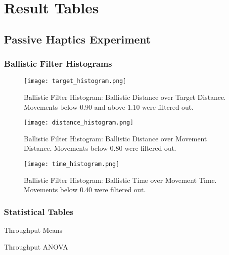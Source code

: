\chapter{Result Tables}

\section{Passive Haptics Experiment}
\label{sec:app_ph_exp}

\subsection{Ballistic Filter Histograms}
\label{sec:app_ph_metrics}

\begin{figure}[H]
    \centering
    \texttt{[image: target\_histogram.png]}
    \caption{Ballistic Filter Histogram: Ballistic Distance over Target Distance. Movements below 0.90 and above 1.10 were filtered out.}
    \label{fig:ph_histogram_target}
\end{figure}

\begin{figure}[H]
    \centering
    \texttt{[image: distance\_histogram.png]}
    \caption{Ballistic Filter Histogram: Ballistic Distance over Movement Distance. Movements below 0.80 were filtered out.}
    \label{fig:ph_histogram_distance}
\end{figure}

\begin{figure}[H]
    \centering
    \texttt{[image: time\_histogram.png]}
    \caption{Ballistic Filter Histogram: Ballistic Time over Movement Time. Movements below 0.40 were filtered out.}
    \label{fig:ph_histogram_time}
\end{figure}

\subsection{Statistical Tables}

\begin{table}[H]
    \centering
    \caption{Throughput Means}
    \label{tab:ph_throughput_means}
\end{table}

\begin{table}[H]
    \centering
    \caption{Throughput ANOVA}
    \label{tab:ph_throughput_anova}
\end{table}

